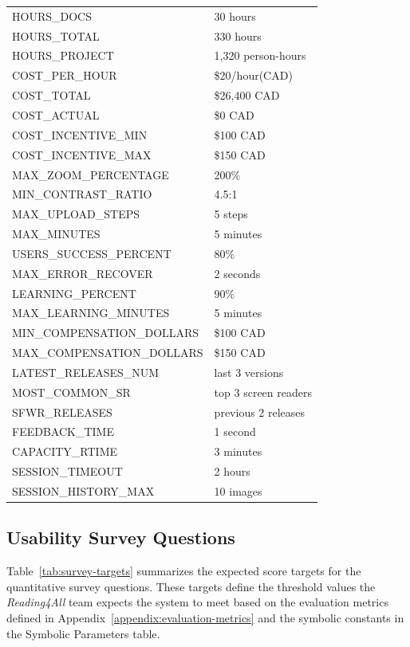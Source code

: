 \documentclass[12pt, titlepage]{article}
\begin{document}
\begin{longtable}{|p{8.0cm}|p{8.0cm}|}
  HOURS\_DOCS & 30 hours \\
  HOURS\_TOTAL & 330 hours \\
  HOURS\_PROJECT & 1,320 person-hours \\
  COST\_PER\_HOUR & \$20/hour(CAD) \\
  COST\_TOTAL & \$26,400 CAD \\
  COST\_ACTUAL & \$0 CAD \\
  COST\_INCENTIVE\_MIN & \$100 CAD \\
  COST\_INCENTIVE\_MAX & \$150 CAD \\
  MAX\_ZOOM\_PERCENTAGE & 200\% \\
  MIN\_CONTRAST\_RATIO & 4.5:1\\
  MAX\_UPLOAD\_STEPS & 5 steps\\
  MAX\_MINUTES & 5 minutes\\
  USERS\_SUCCESS\_PERCENT & 80\%\\
  MAX\_ERROR\_RECOVER & 2 seconds \\
  LEARNING\_PERCENT & 90\% \\
  MAX\_LEARNING\_MINUTES & 5 minutes \\
  MIN\_COMPENSATION\_DOLLARS & \$100 CAD \\
  MAX\_COMPENSATION\_DOLLARS & \$150 CAD \\
  LATEST\_RELEASES\_NUM & last 3 versions \\
  MOST\_COMMON\_SR & top 3 screen readers \\
  SFWR\_RELEASES & previous 2 releases \\
  FEEDBACK\_TIME & 1 second \\
  CAPACITY\_RTIME & 3 minutes \\
  SESSION\_TIMEOUT & 2 hours \\
  SESSION\_HISTORY\_MAX & 10 images \\

\bottomrule
\end{longtable}

\subsection{Usability Survey Questions}
\label{appendix:usability}
\noindent Table~\ref{tab:survey-targets} summarizes the expected score targets for the quantitative survey questions. These targets define the threshold values the \textit{Reading4All} team expects the system to meet based on the evaluation metrics defined in Appendix~\ref{appendix:evaluation-metrics} and the symbolic constants in the Symbolic Parameters table.
\end{document}
